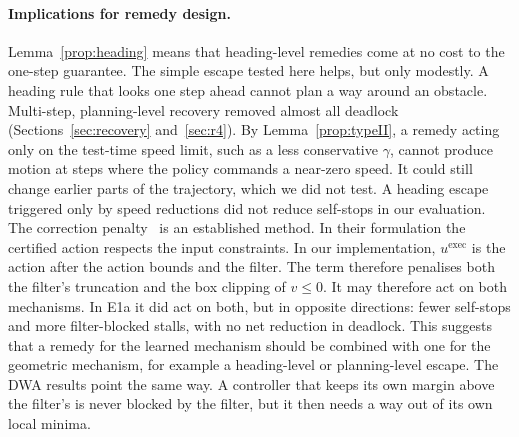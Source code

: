 \documentclass[11pt]{article}
\theoremstyle{definition}
\theoremstyle{remark}
\begin{document}
\paragraph{Implications for remedy design.} Lemma~\ref{prop:heading} means that heading-level remedies come at no cost to the one-step guarantee. The simple escape tested here helps, but only modestly. A heading rule that looks one step ahead cannot plan a way around an obstacle. Multi-step, planning-level recovery removed almost all deadlock (Sections~\ref{sec:recovery} and~\ref{sec:r4}). By Lemma~\ref{prop:typeII}, a remedy acting only on the test-time speed limit, such as a less conservative $\gamma$, cannot produce motion at steps where the policy commands a near-zero speed. It could still change earlier parts of the trajectory, which we did not test. A heading escape triggered only by speed reductions did not reduce self-stops in our evaluation. The correction penalty~\cite{pizarro2025filtering} is an established method. In their formulation the certified action respects the input constraints. In our implementation, $u^{\mathrm{exec}}$ is the action after the action bounds and the filter. The term therefore penalises both the filter's truncation and the box clipping of $v\le0$. It may therefore act on both mechanisms. In E1a it did act on both, but in opposite directions: fewer self-stops and more filter-blocked stalls, with no net reduction in deadlock. This suggests that a remedy for the learned mechanism should be combined with one for the geometric mechanism, for example a heading-level or planning-level escape. The DWA results point the same way. A controller that keeps its own margin above the filter's is never blocked by the filter, but it then needs a way out of its own local minima.

\end{document}
